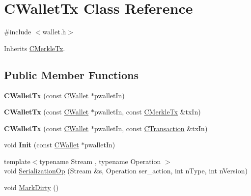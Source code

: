 \hypertarget{class_c_wallet_tx}{}\section{C\+Wallet\+Tx Class Reference}
\label{class_c_wallet_tx}


{\ttfamily \#include $<$wallet.\+h$>$}



Inherits \mbox{\hyperlink{class_c_merkle_tx}{C\+Merkle\+Tx}}.

\subsection*{Public Member Functions}
\begin{DoxyCompactItemize}
\item 
\mbox{\label{class_c_wallet_tx_a0b1a0f58fbe4c65d47136e1a650cee84}} 
{\bfseries C\+Wallet\+Tx} (const \mbox{\hyperlink{class_c_wallet}{C\+Wallet}} $\ast$pwallet\+In)
\item 
\mbox{\label{class_c_wallet_tx_a8e58ffb8a69ea68fc366b8a53ef345ef}} 
{\bfseries C\+Wallet\+Tx} (const \mbox{\hyperlink{class_c_wallet}{C\+Wallet}} $\ast$pwallet\+In, const \mbox{\hyperlink{class_c_merkle_tx}{C\+Merkle\+Tx}} \&tx\+In)
\item 
\mbox{\label{class_c_wallet_tx_a626a5d41502247ea13b0c90694455468}} 
{\bfseries C\+Wallet\+Tx} (const \mbox{\hyperlink{class_c_wallet}{C\+Wallet}} $\ast$pwallet\+In, const \mbox{\hyperlink{class_c_transaction}{C\+Transaction}} \&tx\+In)
\item 
\mbox{\label{class_c_wallet_tx_ad207b1e6b355946842a126bc14c7e793}} 
void {\bfseries Init} (const \mbox{\hyperlink{class_c_wallet}{C\+Wallet}} $\ast$pwallet\+In)
\item 
{\footnotesize template$<$typename Stream , typename Operation $>$ }\\void \mbox{\hyperlink{class_c_wallet_tx_a94e65d0105f2a75a627e374b0bbefe06}{Serialization\+Op}} (Stream \&s, Operation ser\+\_\+action, int n\+Type, int n\+Version)
\item 
\mbox{\label{class_c_wallet_tx_ac8a376bcb955e437489504dc596b43cf}} 
void \mbox{\hyperlink{class_c_wallet_tx_ac8a376bcb955e437489504dc596b43cf}{Mark\+Dirty}} ()

\end{DoxyCompactItemize}
